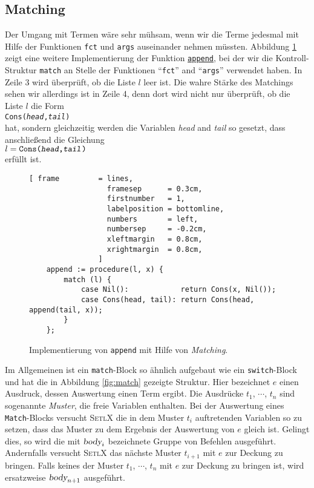\subsection{Matching}
Der Umgang mit Termen wäre sehr mühsam, wenn wir die Terme jedesmal mit Hilfe der Funktionen
\texttt{fct} und \texttt{args} auseinander nehmen müssten.  Abbildung \ref{fig:append-match.stlx} 
zeigt eine weitere Implementierung der Funktion
\href{https://github.com/karlstroetmann/Logik/blob/master/SetlX/append-match.stlx}{\texttt{append}}, 
bei der wir die Kontroll-Struktur \texttt{match} an Stelle der Funktionen ``\texttt{fct}''
and ``\texttt{args}'' verwendet haben.  In Zeile 3 wird  überprüft, ob die Liste $l$ leer ist.
Die wahre Stärke des Matchings sehen wir allerdings ist in Zeile 4, denn dort wird nicht nur
überprüft, ob die Liste $l$ die Form
\\[0.2cm]
\hspace*{1.3cm}
\texttt{Cons(\textsl{head},\textsl{tail})}
\\[0.2cm]
hat, sondern gleichzeitig werden die Variablen \textsl{head} and \textsl{tail} so gesetzt, dass
anschließend die Gleichung
\\[0.2cm]
\hspace*{1.3cm}
$l = \texttt{Cons(\textsl{head},\textsl{tail})}$
\\[0.2cm]
erfüllt ist.


\begin{figure}[!ht]
\centering
\begin{Verbatim}[ frame         = lines, 
                  framesep      = 0.3cm, 
                  firstnumber   = 1,
                  labelposition = bottomline,
                  numbers       = left,
                  numbersep     = -0.2cm,
                  xleftmargin   = 0.8cm,
                  xrightmargin  = 0.8cm,
                ]
    append := procedure(l, x) {
        match (l) {
            case Nil():            return Cons(x, Nil());
            case Cons(head, tail): return Cons(head, append(tail, x));
        }
    };
\end{Verbatim}
\vspace*{-0.3cm}
\caption{Implementierung von \texttt{append} mit Hilfe von \emph{Matching}.}
\label{fig:append-match.stlx}
\end{figure}

Im Allgemeinen ist  ein \texttt{match}-Block so ähnlich aufgebaut wie ein
\texttt{switch}-Block und hat die in Abbildung \ref{fig:match} gezeigte Struktur.
Hier bezeichnet $e$ einen Ausdruck, dessen Auswertung einen Term ergibt.  
Die Ausdrücke $t_1$, $\cdots$, $t_n$ sind sogenannte \emph{Muster}, die freie
Variablen enthalten.  Bei der Auswertung eines \texttt{Match}-Blocks versucht
\textsc{SetlX} die in dem Muster $t_i$ auftretenden Variablen so zu setzen, dass das Muster
zu dem Ergebnis der Auswertung von $e$ gleich ist.  Gelingt dies, so wird die
mit $\textsl{body}_i$ bezeichnete Gruppe von Befehlen ausgeführt.  Andernfalls
versucht \textsc{SetlX} das nächste Muster $t_{i+1}$ mit $e$ zur Deckung zu bringen.
Falls keines der Muster $t_1$, $\cdots$, $t_n$ mit $e$ zur Deckung zu bringen ist, wird
ersatzweise $\textsl{body}_{n+1}$ ausgeführt.  


